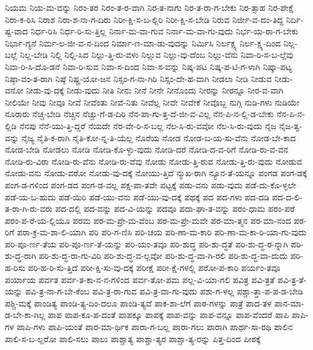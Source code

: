 {ನಿಯಮ
ನಿಯ-ಮ-ವನ್ನು
ನಿರಂ-ತರ
ನಿರಂ-ತ-ರ-ವಾಗಿ
ನಿರ-ತ-ನಾಗು
ನಿರ-ತ-ರಾ-ಗ-ಬೇಕು
ನಿರ-ತ್ಸಾಹ
ನಿರ-ಪೇಕ್ಷೆ
ನಿರಾ-ಕ-ರಿಸಿ
ನಿರಾಶ
ನಿರಾ-ಶ-ನಾ-ಗ-ದಿರು
ನಿರೀ-ಕ್ಷಿ-ಸ-ಬ-ಲ್ಲಿರಿ
ನಿರೀ-ಕ್ಷಿ-ಸ-ಬೇಡಿ
ನಿರುವ
ನಿರ್ಜೀ-ವ-ದಂ-ತಿದ್ದ
ನಿರ್ದಿ-ಷ್ಟ-ವಾದ
ನಿರ್ಧ-ರಿಸಿ
ನಿರ್ಧ-ರಿ-ಸು-ತ್ತಿಲ್ಲ
ನಿರ್ನಾ-ಮ-ವಾ-ಗುವ
ನಿರ್ನಾ-ಮ-ವಾ-ಗು-ವುದು
ನಿರ್ಭ-ಯ-ರಾ-ಗ-ಬೇಕು
ನಿರ್ಭಾ-ಗ್ಯನೆ
ನಿರ್ಮ-ಲ-ಜೀ-ವ-ನ-ದಿಂದ
ನಿರ್ಮಾ-ಣ-ಮಾ-ಡು-ವುದನ್ನು
ನಿರ್ಮಿಸಿ
ನಿರ್ಲಕ್ಷ್ಯ
ನಿರ್ಲ-ಕ್ಷ್ಯ-ದಿಂದ
ನಿಲ್ಲ-ಬಲ್ಲೆ
ನಿಲ್ಲ-ಬೇಡಿ
ನಿಲ್ಲಿ
ನಿಲ್ಲಿ-ಸಿದ
ನಿಲ್ಲು-ತ್ತಿ-ರು-ವಳು
ನಿಲ್ಲುವ
ನಿಲ್ಲು-ವು-ದೆಂಬ
ನಿಲ್ಲು-ವೆನು
ನಿವಾ-ರಿ-ಸ-ಬ-ಲ್ಲೆವು
ನಿವಾ-ರಿ-ಸಿ-ದೊ-ಡನೆ
ನಿವಾ-ರಿ-ಸುವ
ನಿವಾ-ಸ-ದಿಂದ
ನಿವಾ-ಸ-ವನ್ನು
ನಿಷ್ಕ-ಪಟ
ನಿಷ್ಕ-ಪ-ಟಿ-ಗ-ಳಾಗಿ
ನಿಷ್ಕಾ-ಪಟ್ಯ
ನಿಷ್ಠಾ-ವಂ-ತ-ರಾಗಿ
ನಿಷ್ಠೆ
ನಿಷ್ಪ್ರ-ಯೋ-ಜನ
ನಿಸ್ಸಂ-ಗ-ನಾ-ಗಿರಿ
ನಿಸ್ಸಂ-ದೇ-ಹ-ವಾಗಿ
ನೀಡಲಾ
ನೀಡಿ
ನೀಡುವ
ನೀಡು-ವನೋ
ನೀಡು-ವು-ದಕ್ಕೆ
ನೀಡು-ವುದು
ನೀತಿ
ನೀನು
ನೀನೆ
ನೀನೇ
ನೀನೊಂದು
ನೀರನ್ನು
ನೀರನ್ನೂ
ನೀರ-ವ-ವಾಗಿ
ನೀಲಿಯೇ
ನೀವು
ನೀವೂ
ನೀವೆ
ನೀವೆಂತು
ನೀವೆ-ನಿತು
ನೀವೆಲ್ಲ
ನೀವೇ
ನೀವೇಕೆ
ನೀವೊಬ್ಬ
ನುಗ್ಗಿ
ನುಡಿ-ಗಳು
ನುಡಿಯೇ
ನೂರಾರು
ನೆಚ್ಚ-ಬೇಡಿ
ನೆಚ್ಚಿನ
ನೆಚ್ಚು-ಗೆ-ಡ-ದಿರಿ
ನೆನ-ಪಾ-ಗು-ತ್ತ-ದೆ-ಜೀ-ವ-ವಿಲ್ಲ
ನೆನ-ಪಿ-ನ-ಲ್ಲಿ-ಡ-ಬೇಕು
ನೆನ-ಪಿ-ನ-ಲ್ಲಿಡಿ
ನೆನಪು
ನೆನೆ-ಯು-ತ್ತಿ-ದ್ದರೆ
ನೆಯದೇ
ನೆರ-ವೇ-ರಿ-ಸ-ಬಲ್ಲ
ನೆಲ-ಸಿ-ರು-ವವೋ
ನೆಲ-ಸಿ-ರು-ವುದು
ನೈಜ
ನೈಜ-ತ್ವ-ವನ್ನು
ನೈಜ್ಯ
ನೈತಿ-ಕ-ರಾಗಿ
ನೈತಿ-ಕೋ-ನ್ನ-ತಿ-ಯೆಲ್ಲ
ನೊರೆಯ
ನೋಡ
ನೋಡ-ಬ-ಯ-ಸು-ವೆನು
ನೋಡ-ಬೇ-ಕಾದ
ನೋಡ-ಬೇಡಿ
ನೋಡಲು
ನೋಡಿ
ನೋಡಿ-ಕೊ-ಳ್ಳು-ವುದು
ನೋಡಿ-ದರೆ
ನೋಡಿ-ದ-ವ-ರಿಗೆ
ನೋಡಿ-ರು-ವ-ವನ
ನೋಡಿ-ರು-ವಿರಾ
ನೋಡಿ-ರು-ವೆನು
ನೋಡಿ-ರು-ವೆವು
ನೋಡು
ನೋಡು-ತ್ತಿ-ರುವ
ನೋಡು-ತ್ತಿ-ರು-ವುದು
ನೋಡುವ
ನೋಡು-ವನು
ನೋಡು-ವರೋ
ನೋಡು-ವು-ದಕ್ಕೆ
ನೋಯು-ತ್ತಿದೆ
ನ್ಮುಖ-ರಾಗಿ
ನ್ಯೂನ-ತೆ-ಯನ್ನೂ
ಪಂಗಡ
ಪಂಗ-ಡಕ್ಕೆ
ಪಂಗ-ಡ-ಗಳಿಂದ
ಪಂಗ-ಡದ
ಪಂಗ-ಡ-ವಲ್ಲ
ಪಕ್ಷ-ಪಾ-ತವೇ
ಪಟ್ಟಕ್ಕೆ
ಪಡು-ವನು
ಪಡು-ವುದು
ಪಡೆ-ದು-ಕೊ-ಳ್ಳಲೇ
ಪಡೆ-ಯ-ಬ-ಹುದು
ಪಡೆ-ಯಿರಿ
ಪಡೆ-ಯು-ವನು
ಪಡೆ-ಯು-ವು-ದಕ್ಕೆ
ಪಥಕ್ಕೆ
ಪದ
ಪದ-ಗಳು
ಪದ-ದಡಿ
ಪದ-ದ-ಲಿ-ತ-ರಾ-ಗಿ-ರು-ವರು
ಪದ-ದಲ್ಲಿ
ಪದ-ವನ್ನು
ಪದ-ವಿ-ಯನ್ನು
ಪದವೂ
ಪದಾ-ಘಾ-ತ-ವನ್ನು
ಪರಂ-ಧಾಮ
ಪರಂ-ಪರೆ
ಪರಂ-ಪ-ರೆ-ಯ-ಲ್ಲಿಯೂ
ಪರಮ
ಪರ-ಮ-ಪ್ರೇ-ಮ-ವೆಂಬ
ಪರ-ಮ-ಪ್ರೇ-ಮವೇ
ಪರ-ಮಾ-ತ್ಮನ
ಪರ-ಮಾ-ನಂದ
ಪರ-ರಿಗೆ
ಪರಾ-ಕ್ರ-ಮ-ಶಾ-ಲಿ-ಯಾಗಿ
ಪರಿ
ಪರಿ-ಗ-ಣಿಸಿ
ಪರಿ-ಚಯ
ಪರಿ-ಣಾ-ಮ-ಕಾರಿ
ಪರಿ-ಣಾ-ಮ-ಕಾ-ರಿ-ಯಾ-ಗು-ವುದು
ಪರಿ-ಪೂ-ರ್ಣ-ತೆಯ
ಪರಿ-ಪೂ-ರ್ಣ-ತೆ-ಯನ್ನು
ಪರಿ-ಯಂ-ತವೂ
ಪರಿ-ಶುದ್ಧ
ಪರಿ-ಶು-ದ್ಧತೆ
ಪರಿ-ಶು-ದ್ಧ-ರ-ನ್ನಾಗಿ
ಪರಿ-ಶು-ದ್ಧ-ರಾಗಿ
ಪರಿ-ಶು-ದ್ಧ-ರಾ-ಗು-ವಿರಿ
ಪರಿ-ಶು-ದ್ಧ-ವ-ಲ್ಲವೋ
ಪರಿ-ಶು-ದ್ಧ-ವಾ-ಗಿ-ರಲಿ
ಪರಿ-ಶು-ದ್ಧ-ವಾ-ದುದು
ಪರಿ-ಹ-ರಿಸು
ಪರಿ-ಹ-ರಿ-ಸು-ತ್ತಿದೆ
ಪರೀ-ಕ್ಷಿ-ಸು-ವು-ದಕ್ಕೆ
ಪರೀಕ್ಷೆ
ಪರೀ-ಕ್ಷೆ-ಗಳಲ್ಲಿ
ಪರೋ-ಪ-ಕಾರಿ
ಪರ್ಯಂ-ತವೂ
ಪರ್ಯಾಯ
ಪರ್ವತ
ಪರ್ವ-ತ-ಕಾ-ನ-ನ-ಗಳಿಂದ
ಪರ್ವ-ತೋ-ಪಮ
ಪಲ್ಲ-ವಿ-ಯಾ-ಗಲಿ
ಪವಿತ್ರ
ಪವಿ-ತ್ರತೆ
ಪವಿ-ತ್ರ-ತೆ-ಯನ್ನು
ಪವಿ-ತ್ರ-ನಾ-ಗ-ಬೇ-ಕೆಂಬ
ಪವಿ-ತ್ರ-ರಾ-ಗುವ
ಪವಿ-ತ್ರ-ವಾ-ಗು-ವುದು
ಪಶು-ಗ-ಳಲ್ಲ
ಪಶ್ಚಾ-ತ್ತಾ-ಪ-ಪ-ಡ-ಬೇಡಿ
ಪಶ್ಚಿ-ಮಕ್ಕೆ
ಪಾಂಡಿತ್ಯ
ಪಾಂಡಿ-ತ್ಯ-ದಿಂ-ದಲೂ
ಪಾಂಡಿ-ತ್ಯವೆ
ಪಾಕ-ಶಾ-ಲೆಗೆ
ಪಾಠ-ಗಳನ್ನು
ಪಾತ್ರೆ
ಪಾದ-ತಳ
ಪಾನ-ಮಾ-ಡ-ಬೇ-ಕಾ-ಗಿಲ್ಲ
ಪಾಪ
ಪಾಪ-ಕೂ-ಪ-ದಂತೆ
ಪಾಪಕ್ಕೂ
ಪಾಪಕ್ಕೆ
ಪಾಪ-ವನ್ನು
ಪಾಪ-ವನ್ನೂ
ಪಾಪ-ವೆಂದರೆ
ಪಾಪಿ
ಪಾಪಿ-ಗಳ
ಪಾಪಿ-ಗಳು
ಪಾಪಿ-ಯಂತೆ
ಪಾರ-ಮಾ-ರ್ಥಿಕ
ಪಾರಾ-ಗ-ಬಲ್ಲ
ಪಾರಾ-ಗಲು
ಪಾರಾಗಿ
ಪಾರ್ಥ-ಸಾ-ರಥಿ
ಪಾಲಿನ
ಪಾಲಿ-ಸ-ಬ-ಲ್ಲರೋ
ಪಾಲಿ-ಸಲು
ಪಾಲು
ಪಾಶ್ಚಾತ್ಯ
ಪಾಶ್ಚಾ-ತ್ಯರ
ಪಾಶ್ಚಾ-ತ್ಯ-ರನ್ನು
ಪಿತ್ತ-ದಿಂದ
ಪೀಠಕ್ಕೆ
}
